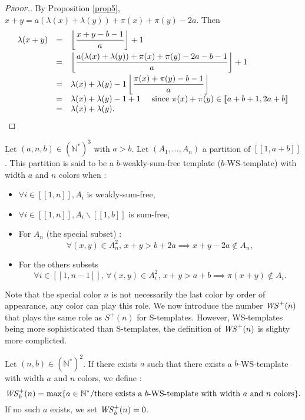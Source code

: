 \begin{proof}[\textsc{Proof.}]
By Proposition \ref{prop5}, \(x + y = a (\lambda(x) + \lambda(y)) + \pi(x) + \pi(y) - 2 a\). Then
\[
\begin{array}{l l l}
	\lambda(x + y) & = & \left \lfloor \dfrac{x + y - b - 1}{a} \right \rfloor + 1 \vspace{1mm} \\
	 & = & \left \lfloor \dfrac{a (\lambda(x) + \lambda(y)) + \pi(x) + \pi(y) - 2 a - b - 1}{a} \right \rfloor + 1 \vspace{1mm} \\
	 & = & \lambda(x) + \lambda(y) - 1 \left \lfloor \dfrac{\pi(x) + \pi(y) - b - 1}{a}\right\rfloor \\
	 & = & \lambda(x)+\lambda(y) -1 +1 ~~~~\text{since } \pi(x) + \pi(y) \in [\![a + b + 1, 2 a + b]\!] \\
	 & =& \lambda(x)+\lambda(y).
\end{array}
\]
\end{proof}

\begin{definition}
Let \( (a,n,b) \in (\mathbb{N}^*)^3\) with \(a > b\). Let \((A_1,...,A_n)\) a partition of  \([\![1, a + b]\!]\).
This partition is said to be a \(b\)-weakly-sum-free template (\(b\)-WS-template) with width \(a\) and \(n\) colors when :

\begin{itemize}
\item \(\forall i \in [\![1, n]\!], A_i\) is weakly-sum-free,
\item \(\forall i \in [\![1, n]\!], A_i\backslash [\![1, b]\!]\) is sum-free,
\item For \(A_n\) (the special subset) :
	\[
	\forall (x,y) \in A_n^2, \,x+y>b+2a \implies x+y-2a\notin A_n,
	\]
\item For the others subsets
	\[
	\forall i \in [\![1,n-1]\!], \, \forall(x,y) \in A_i^2, \, x+y>a+b \implies \pi(x+y) \notin A_i.
	\]
\end{itemize}
\end{definition}

Note that the special color \(n\) is not necessarily the last color by order of appearance, any color can play this role.
We now introduce the number \(\mathit{WS}^+(n)\) that plays the same role as \(S^+(n)\) for S-templates.
However, WS-templates being more sophisticated than S-templates, the definition of \(\mathit{WS}^+(n)\)
is slighty more complicted.

\begin{definition}
Let \( (n,b) \in (\mathbb{N}^*)^2\). If there exists \(a\) such that there exists a \(b\)-WS-template with width \(a\)
and \(n\) colors, we define :
\[
\mathit{WS}_b^+(n)= \max \{a \in \mathbb{N}^*/ \text{there exists a } b \text{-WS-template with width } a \text{ and } n \text{ colors} \}.
\]
If no such \(a\) exists, we set \(\mathit{WS}_b^+(n) = 0\).
\end{definition}

